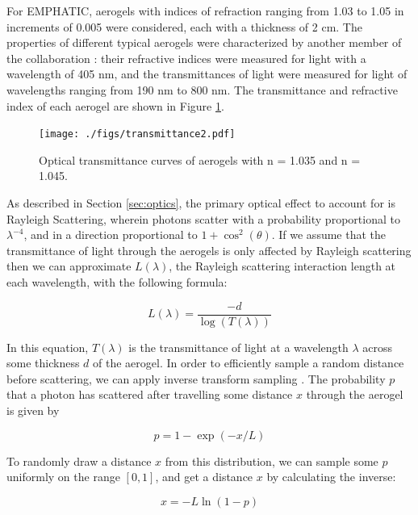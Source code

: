 For EMPHATIC, aerogels with indices of refraction ranging from 1.03 to 1.05 in increments of 0.005 were considered, each with a thickness of 2 cm.
The properties of different typical aerogels were characterized by another member of the collaboration : their refractive indices were measured for light with a wavelength of 405 nm, and the transmittances of light were measured for light of wavelengths ranging from 190 nm to 800 nm.
The transmittance and refractive index of each aerogel are shown in Figure \ref{fig:transmittance}.

\begin{figure}[]
  \centering
  \texttt{[image: ./figs/transmittance2.pdf]}
    \caption{Optical transmittance curves of aerogels with n = 1.035 and n = 1.045.}
  \label{fig:transmittance}
\end{figure}

As described in Section \ref{sec:optics}, the primary optical effect to account for is Rayleigh Scattering, wherein photons scatter with a probability proportional to $\lambda^{-4}$, and in a direction proportional to $1 + \cos^2(\theta)$.
If we assume that the transmittance of light through the aerogels is only affected by Rayleigh scattering then we can approximate $L(\lambda)$, the Rayleigh scattering interaction length at each wavelength, with the following formula:

\begin{equation}
L(\lambda) = \frac{-d}{\log(T(\lambda))}
    \label{eq:scatLength}
\end{equation}

In this equation, $T(\lambda)$ is the transmittance of light at a wavelength $\lambda$ across some thickness $d$ of the aerogel.
In order to efficiently sample a random distance before scattering, we can apply inverse transform sampling .
The probability $p$ that a photon has scattered after travelling some distance $x$ through the aerogel is given by

\begin{equation}
p = 1 - \exp(-x/L)
    \label{eq:scatProb}
\end{equation}

To randomly draw a distance $x$ from this distribution, we can sample some $p$ uniformly on the range $[0,1]$, and get a distance $x$ by calculating the inverse:

\begin{equation}
x =   -L\ln(1-p)
  \label{eq:randomScat}
\end{equation}

